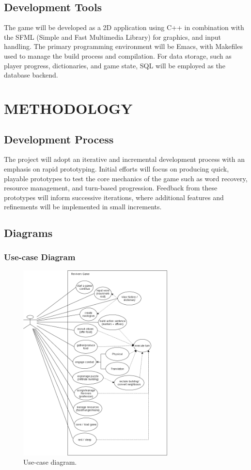 \documentclass[11pt]{article}
\begin{document}
\subsection{Development Tools}
The game will be developed as a 2D application using C++ in combination with the SFML (Simple and Fast Multimedia Library) for graphics, and input handling.  
The primary programming environment will be Emacs, with Makefiles used to manage the build process and compilation.  
For data storage, such as player progress, dictionaries, and game state, SQL will be employed as the database backend.


\section{METHODOLOGY}
\subsection{Development Process}
The project will adopt an iterative and incremental development process with an emphasis on rapid prototyping. 
Initial efforts will focus on producing quick, playable prototypes to test the core mechanics of the game such as word recovery, resource management, and turn-based progression. 
Feedback from these prototypes will inform successive iterations, where additional features and refinements will be implemented in small increments.\\

\subsection{Diagrams}
\subsubsection{Use-case Diagram}

\begin{figure}[H]
  \centering
  \includegraphics[width=0.7\textwidth]{images/usecase.png}
  \caption{Use-case diagram.}
  \label{fig:usecase}
\end{figure}
\end{document}
